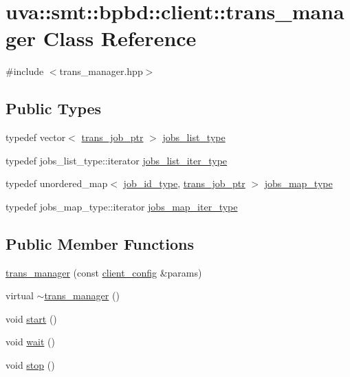 \hypertarget{classuva_1_1smt_1_1bpbd_1_1client_1_1trans__manager}{}\section{uva\+:\+:smt\+:\+:bpbd\+:\+:client\+:\+:trans\+\_\+manager Class Reference}
\label{classuva_1_1smt_1_1bpbd_1_1client_1_1trans__manager}


{\ttfamily \#include $<$trans\+\_\+manager.\+hpp$>$}

\subsection*{Public Types}
\begin{DoxyCompactItemize}
\item 
typedef vector$<$ \hyperlink{namespaceuva_1_1smt_1_1bpbd_1_1client_a9de0122a1e3e5b28765f0b7b06449aa5}{trans\+\_\+job\+\_\+ptr} $>$ \hyperlink{classuva_1_1smt_1_1bpbd_1_1client_1_1trans__manager_aab9c124d930eca091e5140faa0b306f2}{jobs\+\_\+list\+\_\+type}
\item 
typedef jobs\+\_\+list\+\_\+type\+::iterator \hyperlink{classuva_1_1smt_1_1bpbd_1_1client_1_1trans__manager_a07f34153efcba519e36ead6bf39c881e}{jobs\+\_\+list\+\_\+iter\+\_\+type}
\item 
typedef unordered\+\_\+map$<$ \hyperlink{namespaceuva_1_1smt_1_1bpbd_1_1common_1_1messaging_af12d41e7490214ac057969e9d4af1436}{job\+\_\+id\+\_\+type}, \hyperlink{namespaceuva_1_1smt_1_1bpbd_1_1client_a9de0122a1e3e5b28765f0b7b06449aa5}{trans\+\_\+job\+\_\+ptr} $>$ \hyperlink{classuva_1_1smt_1_1bpbd_1_1client_1_1trans__manager_a8aac327989f3657f3977a52e614262ef}{jobs\+\_\+map\+\_\+type}
\item 
typedef jobs\+\_\+map\+\_\+type\+::iterator \hyperlink{classuva_1_1smt_1_1bpbd_1_1client_1_1trans__manager_a682b34240d22a905295f1273cfd03310}{jobs\+\_\+map\+\_\+iter\+\_\+type}
\end{DoxyCompactItemize}
\subsection*{Public Member Functions}
\begin{DoxyCompactItemize}
\item 
\hyperlink{classuva_1_1smt_1_1bpbd_1_1client_1_1trans__manager_a5eef60a216b435f787253352810b1cda}{trans\+\_\+manager} (const \hyperlink{structuva_1_1smt_1_1bpbd_1_1client_1_1client__config}{client\+\_\+config} \&params)
\item 
virtual \hyperlink{classuva_1_1smt_1_1bpbd_1_1client_1_1trans__manager_a2a719a7a4de3935f6c4caa4cf2b98aa5}{$\sim$trans\+\_\+manager} ()
\item 
void \hyperlink{classuva_1_1smt_1_1bpbd_1_1client_1_1trans__manager_a45766408524b5edef15a947786a1bd5b}{start} ()
\item 
void \hyperlink{classuva_1_1smt_1_1bpbd_1_1client_1_1trans__manager_afac6e2a3b5977f7df497067b1a623f4d}{wait} ()
\item 
void \hyperlink{classuva_1_1smt_1_1bpbd_1_1client_1_1trans__manager_a9ef6ac7259d1e31b4dc9df96d557ec34}{stop} ()
\end{DoxyCompactItemize}
